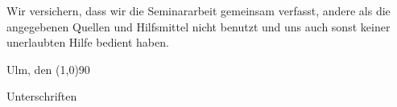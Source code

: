

Wir versichern, dass wir die Seminararbeit gemeinsam verfasst, andere als die angegebenen Quellen und Hilfsmittel nicht benutzt und uns auch sonst keiner unerlaubten Hilfe bedient haben. 
\vspace{3cm}

Ulm, den \hspace{0.2cm} \line(1,0){90} \hspace{3cm} \hrulefill

\hfill {\footnotesize Unterschriften}
\vfill
